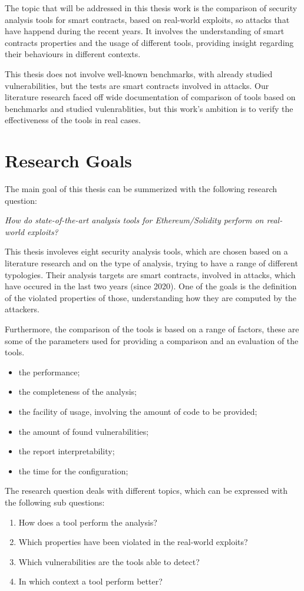 The topic that will be addressed in this thesis work is the comparison of security analysis tools for smart contracts, based on real-world exploits, so attacks that have happend during the recent years. 
It involves the understanding of smart contracts properties and the usage of different tools, 
providing insight regarding their behaviours in different contexts.

This thesis does not involve well-known benchmarks, with already studied vulnerabilities, 
but the tests are smart contracts involved in attacks. 
Our literature research faced off wide documentation of comparison of tools based on benchmarks and studied vulenrablities, 
but this work's ambition is to verify the effectiveness of the tools in real cases.

\section{Research Goals}
\label{sec:Introduction:ResearchGoals}
The main goal of this thesis can be summerized with the following research question:

\emph{How do state-of-the-art analysis tools for Ethereum/Solidity perform on real-world exploits?}

This thesis involeves eight security analysis tools, which are chosen based on a literature research and on the type of analysis, trying to have a range of different typologies.
Their analysis targets are smart contracts, involved in attacks, which have occured in the last two years (since 2020). 
One of the goals is the definition of the violated properties of those, understanding how they are computed by the attackers.

Furthermore, the comparison of the tools is based on a range of factors, these are some of the parameters used for providing a comparison and an evaluation of the tools.
\begin{itemize}
  \item the performance;
  \item the completeness of the analysis;
  \item the facility of usage, involving the amount of code to be provided;
  \item the amount of found vulnerabilities;
  \item the report interpretability;  
  \item the time for the configuration;
\end{itemize}  

The research question deals with different topics, which can be expressed with the following sub questions: 
\begin{enumerate}
  \item How does a tool perform the analysis? 
  \item Which properties have been violated in the real-world exploits? 
  \item Which vulnerabilities are the tools able to detect? 
  \item In which context a tool perform better?
\end{enumerate}


